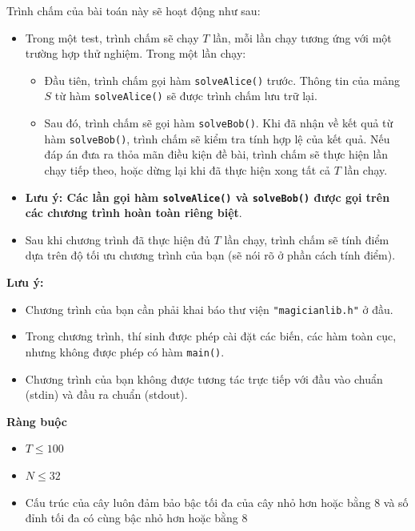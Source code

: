 Trình chấm của bài toán này sẽ hoạt động như sau:
\begin{itemize}
   \item Trong một test, trình chấm sẽ chạy $T$ lần, mỗi lần chạy tương ứng với một trường hợp thử nghiệm. Trong một lần chạy:
   \begin{itemize}
      \item Đầu tiên, trình chấm gọi hàm \texttt{solveAlice()} trước. Thông tin của mảng $S$ từ hàm \texttt{solveAlice()} sẽ được trình chấm lưu trữ lại.
      \item Sau đó, trình chấm sẽ gọi hàm \texttt{solveBob()}. Khi đã nhận về kết quả từ hàm \texttt{solveBob()}, trình chấm sẽ kiểm tra tính hợp lệ của kết quả. Nếu đáp án đưa ra thỏa mãn điều kiện đề bài, trình chấm sẽ thực hiện lần chạy tiếp theo, hoặc dừng lại khi đã thực hiện xong tất cả $T$ lần chạy.
   \end{itemize}
   \item \textbf{Lưu ý: Các lần gọi hàm \texttt{solveAlice()} và \texttt{solveBob()} được gọi trên các chương trình hoàn toàn riêng biệt}.
   \item Sau khi chương trình đã thực hiện đủ $T$ lần chạy, trình chấm sẽ tính điểm dựa trên độ tối ưu chương trình của bạn (sẽ nói rõ ở phần cách tính điểm).
\end{itemize}

\textbf{Lưu ý:}
\begin{itemize}
   \item Chương trình của bạn cần phải khai báo thư viện \texttt{"magicianlib.h"} ở đầu.
   \item Trong chương trình, thí sinh được phép cài đặt các biến, các hàm toàn cục, nhưng không được phép có hàm \texttt{main()}.
   \item Chương trình của bạn không được tương tác trực tiếp với đầu vào chuẩn (stdin) và đầu ra chuẩn (stdout).
\end{itemize}

\textbf{Ràng buộc}
\begin{itemize}
   \item $T\le 100$
   \item $N\le 32$
   \item Cấu trúc của cây luôn đảm bảo bậc tối đa của cây nhỏ hơn hoặc bằng $8$ và số đỉnh tối đa có cùng bậc nhỏ hơn hoặc bằng $8$
\end{itemize}